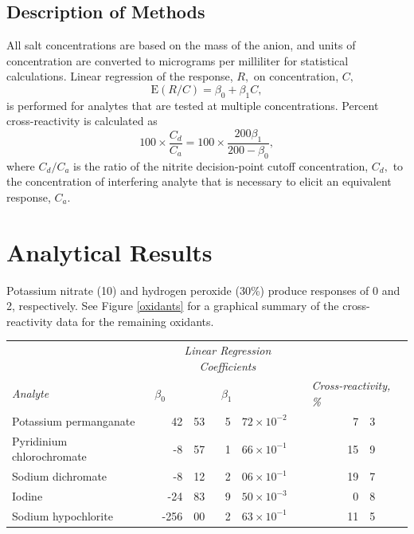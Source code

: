\documentclass[article,11pt,oneside]{memoir}
\begin{document}
\subsection{Description of Methods}
All salt concentrations are based on the mass of the anion, and units
of concentration are converted to micrograms per milliliter for
statistical calculations.
Linear regression of the response, \(R,\) on concentration, \(C,\)
\[
\mathrm{E}(R/C) = \beta_0 + \beta_1 C,
\]
is performed for analytes that are tested at multiple concentrations.
Percent cross-reactivity is calculated as
\[
100 \times \frac{C_d}{C_a} = 100 \times \frac{200\beta_1}{200 - \beta_0},
\]
where \(C_d/C_a\) is the ratio of the nitrite decision-point cutoff concentration, \(C_d,\) to the concentration of interfering analyte that is necessary to elicit an equivalent response, \(C_a\).

\section{Analytical Results}
Potassium nitrate (\unit{10}{\milli\gram\per\milli\liter}) and hydrogen
peroxide (30\%) produce responses of 0 and \unit{2}{\micro\gram\per\milli\liter}, respectively.
See Figure \ref{oxidants} for a graphical summary of the
cross-reactivity data for the remaining oxidants.
\begin{center}
\begin{tabular}{lr@{.}lr@{.}lr@{.}l}
\toprule
 & \multicolumn{4}{c}{\em Linear Regression Coefficients} & \multicolumn{2}{l}{} \tabularnewline\cmidrule(lr){2-5}
{\em Analyte} & \multicolumn{2}{l}{\(\beta_0\)} & \multicolumn{2}{l}{\(\beta_1\)} & \multicolumn{2}{l}{{\em Cross-reactivity, \%}} \tabularnewline\midrule
Potassium permanganate & 42 & 53 & 5 & \(72\times 10^{-2}\) & 7 & 3 \tabularnewline
Pyridinium chlorochromate & -8 & 57 & 1 & \(66\times 10^{-1}\) & 15 & 9 \tabularnewline
Sodium dichromate & -8 & 12 & 2 & \(06\times 10^{-1}\) & 19 & 7 \tabularnewline
Iodine & -24 & 83 & 9 & \(50\times 10^{-3}\) & 0 & 8 \tabularnewline
Sodium hypochlorite & -256 & 00 & 2 & \(63\times 10^{-1}\) & 11 & 5 \tabularnewline
\bottomrule
\end{tabular}
\end{center}
\end{document}

